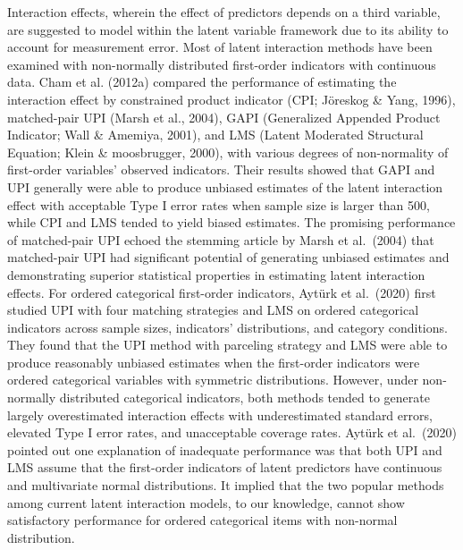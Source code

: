\documentclass[
  11pt,
  man]{apa6}
\begin{document}
Interaction effects, wherein the effect of predictors depends on a third variable, are suggested to model within the latent variable framework due to its ability to account for measurement error. Most of latent interaction methods have been examined with non-normally distributed first-order indicators with continuous data. Cham et al. (2012a) compared the performance of estimating the interaction effect by constrained product indicator (CPI; Jöreskog \& Yang, 1996), matched-pair UPI (Marsh et al., 2004), GAPI (Generalized Appended Product Indicator; Wall \& Amemiya, 2001), and LMS (Latent Moderated Structural Equation; Klein \& moosbrugger, 2000), with various degrees of non-normality of first-order variables' observed indicators. Their results showed that GAPI and UPI generally were able to produce unbiased estimates of the latent interaction effect with acceptable Type I error rates when sample size is larger than 500, while CPI and LMS tended to yield biased estimates. The promising performance of matched-pair UPI echoed the stemming article by Marsh et al.~(2004) that matched-pair UPI had significant potential of generating unbiased estimates and demonstrating superior statistical properties in estimating latent interaction effects. For ordered categorical first-order indicators, Aytürk et al.~(2020) first studied UPI with four matching strategies and LMS on ordered categorical indicators across sample sizes, indicators' distributions, and category conditions. They found that the UPI method with parceling strategy and LMS were able to produce reasonably unbiased estimates when the first-order indicators were ordered categorical variables with symmetric distributions. However, under non-normally distributed categorical indicators, both methods tended to generate largely overestimated interaction effects with underestimated standard errors, elevated Type I error rates, and unacceptable coverage rates. Aytürk et al.~(2020) pointed out one explanation of inadequate performance was that both UPI and LMS assume that the first-order indicators of latent predictors have continuous and multivariate normal distributions. It implied that the two popular methods among current latent interaction models, to our knowledge, cannot show satisfactory performance for ordered categorical items with non-normal distribution.
\end{document}
